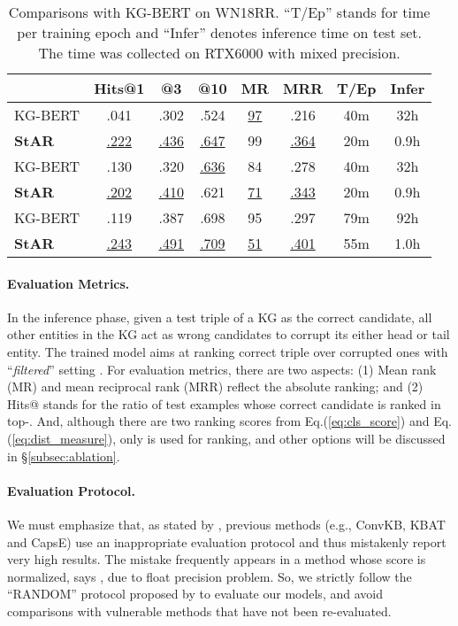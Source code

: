 \documentclass[sigconf]{acmart}
\begin{document}
\begin{table}[t] \small
\caption{\small Comparisons with KG-BERT on WN18RR. ``T/Ep'' stands for time per training epoch and ``Infer'' denotes inference time on test set. The time was collected on RTX6000 with mixed precision. }
    \setlength{\tabcolsep}{1pt}
	\centering
	\begin{tabular}{lccccc|cc}
		\hline
		& \textbf{Hits@1}      & \textbf{@3}      & \textbf{@10}    & \textbf{MR} & \textbf{MRR} & \textbf{T/Ep} & \textbf{Infer} \\ \hline
		KG-BERT& .041        &.302      & .524    &\underline{97}     & .216 & 40m & 32h \\ 
		\textbf{StAR}      &\underline{.222}	&\underline{.436}	&\underline{.647}	&99	&\underline{.364}  & 20m & 0.9h \\ \hline
		KG-BERT  &.130        &.320       & \underline{.636}    &84     &.278  & 40m & 32h  \\ 
		\textbf{StAR} &\underline{.202}	  &\underline{.410}	   & .621          & \underline{71}	   &\underline{.343}  & 20m & 0.9h  \\  \hline
		KG-BERT  &.119        &.387       &.698  &95  & .297  & 79m & 92h \\
		\textbf{StAR}   & \underline{.243}   & \underline{.491}   & \underline{.709} & \underline{51}    & \underline{.401}  & 55m & 1.0h \\ \hline
	\end{tabular}
	\label{tb:comp_baseline}
\end{table}

\paragraph{Evaluation Metrics.}
In the inference phase, given a test triple of a KG as the correct candidate, all other entities in the KG act as wrong candidates to corrupt its either head or tail entity. The trained model aims at ranking correct triple over corrupted ones with ``\textit{filtered}'' setting \citep{TransE}. 
For evaluation metrics, there are two aspects: (1) Mean rank (MR) and mean reciprocal rank (MRR) reflect the absolute ranking; and (2) Hits@ stands for the ratio of test examples whose correct candidate is ranked in top-. 
And, although there are two ranking scores from Eq.(\ref{eq:cls_score}) and Eq.(\ref{eq:dist_measure}), only  is used for ranking, and other options will be discussed in \S\ref{subsec:ablation}. 

\paragraph{Evaluation Protocol.} We must emphasize that, as stated by \citet{re-evaluation}, previous methods (e.g., ConvKB, KBAT and CapsE) use an inappropriate evaluation protocol and thus mistakenly report very high results. 
The mistake frequently appears in a method whose score is normalized, says , due to float precision problem. 
So, we strictly follow the ``RANDOM'' protocol proposed by \citet{re-evaluation} to evaluate our models, and avoid comparisons with vulnerable methods that have not been re-evaluated. 
\end{document}
